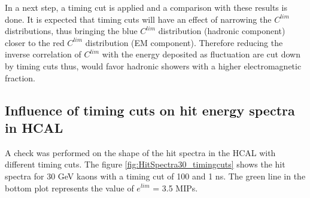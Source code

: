 
In a next step, a timing cut is applied and a comparison with these results is done. It is expected that timing cuts will have an effect of narrowing the $C^{lim}$ distributions, thus bringing the blue $C^{lim}$ distribution (hadronic component) closer to the red $C^{lim}$ distribution (EM component). Therefore reducing the inverse correlation of $C^{lim}$ with the energy deposited as fluctuation are cut down by timing cuts thus, would favor hadronic showers with a higher electromagnetic fraction.

\subsection{Influence of timing cuts on hit energy spectra in HCAL}

A check was performed on the shape of the hit spectra in the HCAL with different timing cuts. The figure \ref{fig:HitSpectra30_timingcuts} shows the hit spectra for 30 GeV kaons with a timing cut of 100 and 1 ns. The green line in the bottom plot represents the value of $e^{lim}$ = 3.5 MIPs.


